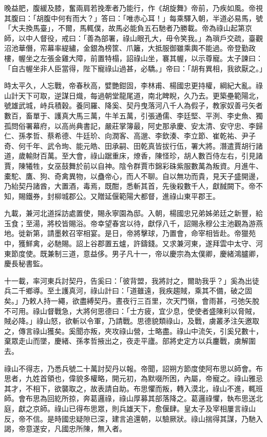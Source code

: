 \begin{pinyinscope}
 晚益肥，腹緩及膝，奮兩肩若挽牽者乃能行，作《胡旋舞》帝前，乃疾如風。帝視其腹曰：「胡腹中何有而大？」答曰：「唯赤心耳！」每乘驛入朝，半道必易馬，號「大夫換馬臺」，不爾，馬輒僕，故馬必能負五石馳者乃勝載。帝為祿山起第京師，以中人督役，戒曰：「善為部署，祿山眼孔大，毋令笑我。」為瑣戶交疏，臺觀沼池華僭，帟幕率緹繡，金銀為榜筐、爪籬，大抵服御雖乘輿不能過。帝登勤政樓，幄坐之左張金雞大障，前置特榻，詔祿山坐，褰其幄，以示尊寵。太子諫曰：「自古幄坐非人臣當得，陛下寵祿山過甚，必驕。」帝曰：「胡有異相，我欲厭之。」



 時太平久，人忘戰，帝春秋高，嬖艷鉗固，李林甫、楊國忠更持權，綱紀大亂。祿山計天下可取，逆謀日熾，每過朝堂龍尾道，南北睥睨，久乃去。更築壘範陽北，號雄武城，峙兵積穀。養同羅、降奚、契丹曳落河八千人為假子，教家奴善弓矢者數百，畜單于、護真大馬三萬，牛羊五萬，引張通儒、李廷堅、平洌、李史魚、獨孤問俗署幕府，以高尚典書記，嚴莊掌簿最，阿史那承慶、安太清、安守忠、李歸仁、孫孝哲、蔡希德、牛廷玠、向潤客、高邈、李欽湊、李立節、崔乾祐、尹子奇、何千年、武令珣、能元皓、田承嗣、田乾真皆拔行伍，署大將。潛遣賈胡行諸道，歲輸財百萬。至大會，祿山踞重床，燎香，陳怪珍，胡人數百侍左右，引見諸賈，陳犧牲，女巫鼓舞於前以自神。陰令群賈市錦彩硃紫服數萬為叛資。月進牛、橐駝、鷹、狗、奇禽異物，以蠱帝心，而人不聊。自以無功而貴，見天子盛開邊，乃紿契丹諸酋，大置酒，毒焉，既酣，悉斬其首，先後殺數千人，獻馘闕下。帝不知，賜鐵券，封柳城郡公。又贈延偃範陽大都督，進祿山東平郡王。



 九載，兼河北道採訪處置使，賜永寧園為邸。入朝，楊國忠兄弟姊弟廷之新豐，給玉食；至湯，將校皆賜浴。帝幸望春宮以待，獻俘八千，詔賜永穆公主池觀為游燕地。徙新第，請墨敕召宰相宴。是日，帝將擊球，乃置會，命宰相皆赴。帝獵苑中，獲鮮禽，必馳賜。詔上谷郡置五爐，許鑄錢。又求兼河東，遂拜雲中太守、河東節度使。既兼制三道，意益侈。男子凡十一，帝以慶宗為太僕卿，慶緒鴻臚卿，慶長秘書監。



 十一載，率河東兵討契丹，告奚曰：「彼背盟，我將討之，爾助我乎？」奚為出徒兵二千鄉導。至土護真河，祿山計曰：「道雖遠，我疾趨賊，乘其不備，破之固矣。」乃敕人持一繩，欲盡縛契丹。晝夜行三百里，次天門嶺，會雨甚，弓弛矢脫不可用。祿山督戰急，大將何思德曰：「士方疲，宜少息，使使者盛陳利以脅賊，賊必降。」祿山怒，欲斬以令軍，乃請戰。思德貌類祿山，及戰，虜叢矛注矢邀取之，傳言祿山獲矣。奚聞亦叛，夾攻祿山營，士略盡。祿山中流矢，引奚兒數十，棄眾走山而墜，慶緒、孫孝哲掖出之，夜走平廬。部將史定方以兵鏖戰，虜解圍去。



 祿山不得志，乃悉兵號二十萬討契丹以報。帝聞，詔朔方節度使阿布思以師會。布思者，九姓首領也，偉貌多權略，開元初，為默啜所困，內屬，帝寵之。祿山雅忌其才，不相下，欲襲取之，故表請自助。布思懼而叛，轉入漠北，祿山不進，輒班師。會布思為回紇所掠，奔葛邏祿，祿山厚募其部落降之。葛邏祿懼，執布思送北庭，獻之京師。祿山已得布思眾，則兵雄天下，愈偃肆。皇太子及宰相屢言祿山反，帝不信。是時國忠疑隙已深，建言追還朝，以驗厥狀。祿山揣得其謀，乃馳入謁，帝意遂安，凡國忠所陳，無入者。




\end{pinyinscope}
